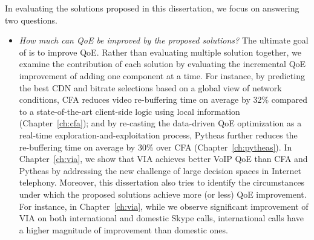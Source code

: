 
In evaluating the solutions proposed in this dissertation, 
we focus on answering two questions.

\begin{itemize}

\item {\em How much can QoE be improved by the proposed solutions?}
The ultimate goal of \ddn is to improve QoE. 
Rather than evaluating multiple solution together, we examine the 
contribution of each solution by evaluating the incremental QoE 
improvement of adding one component at a time. 
For instance, by predicting the best CDN and bitrate selections based on 
a global view of network conditions, CFA reduces video re-buffering time 
on average by 32\% compared to a state-of-the-art client-side logic using 
local information (Chapter~\ref{ch:cfa});
and by re-casting the data-driven QoE optimization as a real-time 
exploration-and-exploitation process, Pytheas further reduces the 
re-buffering time on average by 30\% over CFA (Chapter~\ref{ch:pytheas}).
In Chapter~\ref{ch:via}, we show that VIA achieves better VoIP QoE
than CFA and Pytheas
by addressing the new challenge of large decision spaces in
Internet telephony.
Moreover, this dissertation also tries to identify the circumstances under which
the proposed solutions achieve more (or less) QoE improvement.
For instance, in Chapter~\ref{ch:via}, while 
we observe significant improvement of 
VIA on both international and domestic Skype calls, international calls
have a higher magnitude of improvement than domestic ones.




\end{itemize}
